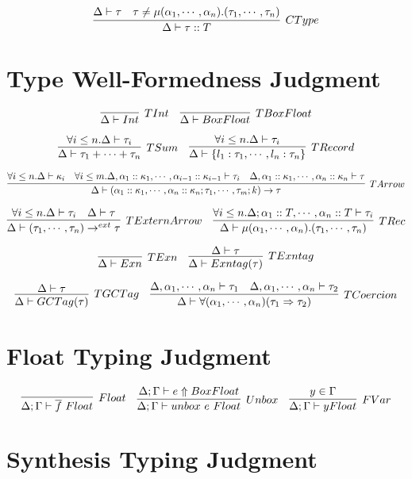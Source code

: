 \documentclass{article}
\begin{document}
$$
\infer[CType]{\Delta \vdash \tau :: T}
{
	\Delta \vdash \tau
	\quad \tau \neq \Rec{\alpha_1,\cdots,\alpha_n}{\tau_1,\cdots,\tau_n}
}
$$

\section{Type Well-Formedness Judgment}

$$
\infer[TInt]{\Delta \vdash \TInt}{}
\quad
\infer[TBoxFloat]{\Delta \vdash \BoxFloat}{}
$$

$$
\infer[TSum]{\Delta \vdash \tau_1 + \cdots + \tau_n}
{
	\forall i \leq n . \Delta \vdash \tau_i
}
\quad
\infer[TRecord]{\Delta \vdash \Record{l_1: \tau_1, \cdots, l_n: \tau_n}}
{
	\forall i \leq n . \Delta \vdash \tau_i
}
$$

$$
\infer[TArrow]{\Delta \vdash \Arrow{\alpha_1::\kappa_1,\cdots,\alpha_n::\kappa_n}{\tau_1,\cdots,\tau_m}{k}{\tau}}
{
	\forall i \leq n . \Delta \vdash \kappa_i
	\quad \forall i \leq m . \Delta, \alpha_1::\kappa_1, \cdots, \alpha_{i-1}::\kappa_{i-1} \vdash \tau_i
	\quad \Delta, \alpha_1::\kappa_1, \cdots, \alpha_n::\kappa_n \vdash \tau
}
$$

$$
\infer[TExternArrow]{\Delta \vdash \ExternArrow{\tau_1,\cdots,\tau_n}{\tau}}
{
	\forall i \leq n . \Delta \vdash \tau_i
	\quad \Delta \vdash \tau
}
\quad
\infer[TRec]{\Delta \vdash \Rec{\alpha_1,\cdots,\alpha_n}{\tau_1,\cdots,\tau_n}}
{
	\forall i \leq n . \Delta; \alpha_1::T, \cdots, \alpha_n::T \vdash \tau_i
}
$$

$$
\infer[TExn]{\Delta \vdash \Exn}{}
\quad
\infer[TExntag]{\Delta \vdash \Exntag{\tau}}
{
	\Delta \vdash \tau
}
$$

$$
\infer[TGCTag]{\Delta \vdash \GCTag{\tau}}
{
	\Delta \vdash \tau
}
\quad
\infer[TCoercion]{\Delta \vdash \Coercion{\alpha_1,\cdots,\alpha_n}{\tau_1}{\tau_2}}
{
	\Delta, \alpha_1, \cdots, \alpha_n \vdash \tau_1
	\quad \Delta, \alpha_1, \cdots, \alpha_n \vdash \tau_2
}
$$

\section{Float Typing Judgment}

$$
\infer[Float]{\Delta; \Gamma \vdash \overline f\ \Float}
{
}
\quad
\infer[Unbox]{\Delta; \Gamma \vdash \Unboxf{e}\ \Float}
{
	\Delta; \Gamma \vdash e \Uparrow \BoxedFloat
}
\quad
\infer[FVar]{\Delta; \Gamma \vdash y \Float}
{
	y \in \Gamma
}
$$

\section{Synthesis Typing Judgment}
\end{document}
